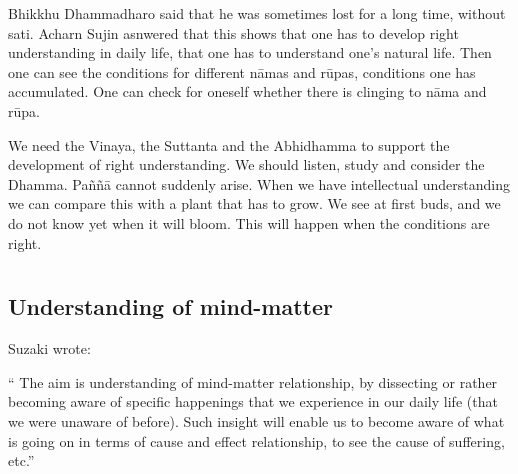 Bhikkhu Dhammadharo said that he was sometimes lost for a long time, without sati. Acharn Sujin asnwered that this shows that one has to develop right understanding in daily life, that one has to understand one’s natural life. Then one can see the conditions for different nāmas and rūpas, conditions one has accumulated. One can check for oneself whether there is clinging to nāma and rūpa.

We need the Vinaya, the Suttanta and the Abhidhamma to support the development of right understanding. We should listen, study and consider the Dhamma. Paññā cannot suddenly arise. When we have intellectual understanding we can compare this with a plant that has to grow. We see at first buds, and we do not know yet when it will bloom. This will happen when the conditions are right.

\chapter[Understanding of mind-matter]{}
\section*{Understanding of mind-matter}

Suzaki wrote: 

`` The aim is understanding of mind-matter relationship, by dissecting or rather becoming aware of specific happenings that we experience in our daily life (that we were unaware of before). Such insight will enable us to become aware of what is going on in terms of cause and effect relationship, to see the cause of suffering, etc.''

